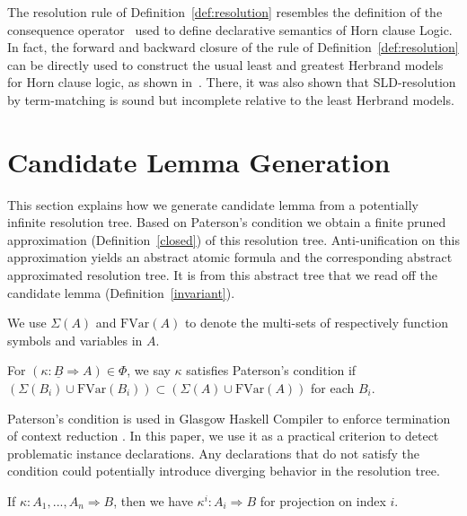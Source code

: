 \documentclass{llncs}
\begin{document}
The resolution rule of Definition~\ref{def:resolution} resembles the definition of the consequence operator~\cite{Llo87} used to
define declarative semantics of Horn clause Logic.
In fact,  the forward and backward closure of the  rule of Definition~\ref{def:resolution} can be directly used to construct the usual least and greatest Herbrand models
for Horn clause logic, as shown in~\cite{KJ15}. There, it was also shown that SLD-resolution by term-matching is sound but incomplete relative to the least Herbrand models.







\section{Candidate Lemma Generation}
\label{inv}

This section explains how we generate candidate lemma from a
 potentially infinite resolution tree. Based on Paterson's condition we obtain
a finite pruned approximation (Definition~\ref{closed}) of this resolution tree.
Anti-unification on this approximation yields an abstract atomic formula and
 the corresponding abstract approximated resolution tree. It is from this abstract
tree that we read off the candidate lemma (Definition~\ref{invariant}).




We use $\Sigma(A)$ and $\mathrm{FVar}(A)$ to denote the
multi-sets of respectively function symbols and variables in $A$.

\begin{definition}
  For $(\kappa : \underline{B} \Rightarrow A) \in \Phi$, we say $\kappa$
satisfies Paterson's condition if $(\Sigma(B_i) \cup \mathrm{FVar}(B_i))
\subset (\Sigma(A) \cup \mathrm{FVar}(A))$ for each $B_i$. 
\end{definition}

Paterson's condition is used in Glasgow Haskell Compiler to enforce termination of context
reduction \cite{SulzmannDJS07}. In this paper, we use it as a practical
criterion to detect problematic instance declarations. Any declarations that do
not satisfy the condition could potentially introduce diverging behavior in
the resolution tree. 



If $\kappa : A_1,..., A_n \Rightarrow B$, then we have $\kappa^i : A_i \Rightarrow B$ for projection on index $i$.
\end{document}
